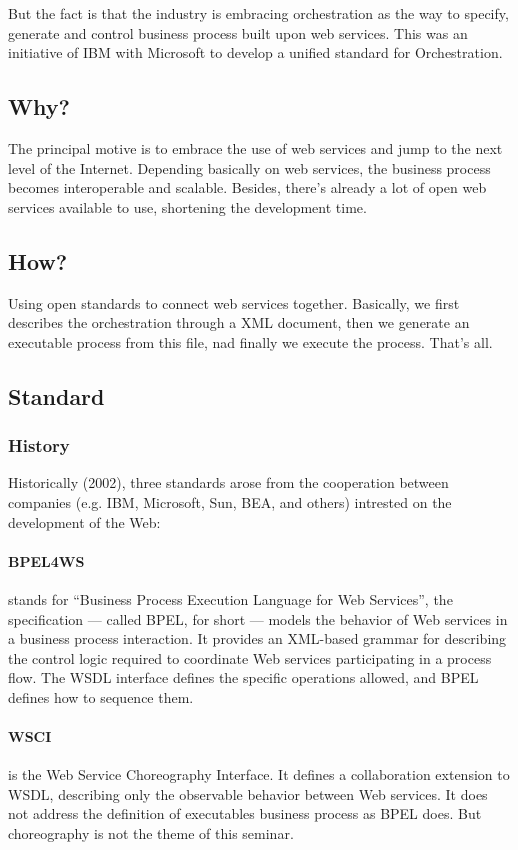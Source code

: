 \documentclass[12pt,a4paper]{article}
\begin{document}
But the fact is that the industry is embracing orchestration as the way to specify, generate and control business process built upon web services. This was an initiative of IBM with Microsoft to develop a unified standard for Orchestration.

\subsection{Why?}

The principal motive is to embrace the use of web services and jump to the next level of the Internet. Depending basically on web services, the business process becomes interoperable and scalable. Besides, there's already a lot of open web services available to use, shortening the development time.

\subsection{How?}
Using open standards to connect web services together.
Basically, we first describes the orchestration through a XML document, then we generate an executable process from this file, nad finally we execute the process.
That's all.

\subsection{Standard}
\subsubsection{History}

Historically (2002), three standards arose from the cooperation between companies (e.g. IBM, Microsoft, Sun, BEA, and others) intrested on the development of the Web:

\paragraph{BPEL4WS} 
stands for ``Business Process Execution Language for Web Services'', the specification — called BPEL, for short — models the behavior of Web services in a business process interaction. It provides an XML-based grammar for describing the control logic required to coordinate Web services participating in a process flow. The WSDL interface defines the specific operations allowed, and BPEL defines how to sequence them.

\paragraph{WSCI}
is the Web Service Choreography Interface. It defines a collaboration extension to WSDL, describing only the observable behavior between Web services. It does not address the definition of executables business process as BPEL does. But choreography is not the theme of this seminar.
\end{document}
